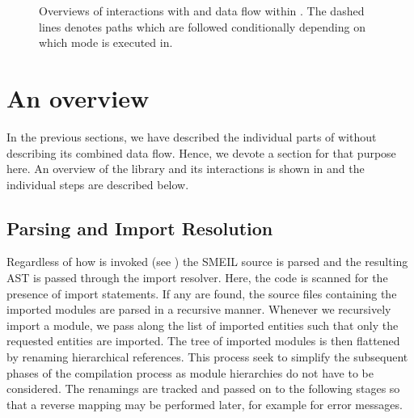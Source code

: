 \begin{figure}
{
  }
  \caption{Overviews of interactions with and data flow within \libsme{}. The
    dashed lines denotes paths which are followed conditionally depending on
    which mode \libsme{} is executed in.}
  \label{fig:overview}
\end{figure}

\section{An overview}
\label{sec:overview}
In the previous sections, we have described the individual parts of \libsme{}
without describing its combined data flow. Hence, we devote a section for that
purpose here. An overview of the \libsme{} library and its interactions is shown
in  and the individual steps are described below.

\subsection{Parsing and Import Resolution} Regardless of how \libsme{} is
invoked (see ) the SMEIL source is parsed and the resulting AST
is passed through the import resolver. Here, the code is scanned for the
presence of import statements. If any are found, the source files containing the
imported modules are parsed in a recursive manner. Whenever we recursively
import a module, we pass along the list of imported entities such that only the
requested entities are imported. The tree of imported modules is then flattened
by renaming hierarchical references. This process seek to simplify the
subsequent phases of the compilation process as module hierarchies do not have
to be considered. The renamings are tracked and passed on to the following
stages so that a reverse mapping may be performed later, for example for error
messages.

